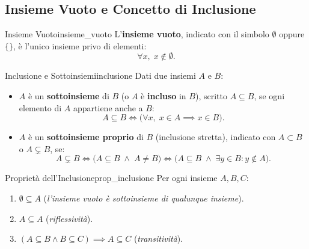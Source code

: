 \subsection{Insieme Vuoto e Concetto di Inclusione}

\begin{definizione}{Insieme Vuoto}{insieme_vuoto}
L'\textbf{insieme vuoto}, indicato con il simbolo $\emptyset$ oppure $\{\}$, è l'unico insieme privo di elementi:
\begin{equation}
    \forall x, \; x \notin \emptyset.
\end{equation}
\end{definizione}

\begin{definizione}{Inclusione e Sottoinsiemi}{inclusione}
Dati due insiemi $A$ e $B$:
\begin{itemize}
    \item $A$ è un \textbf{sottoinsieme} di $B$ (o $A$ è \textbf{incluso} in $B$), scritto $A \subseteq B$, se ogni elemento di $A$ appartiene anche a $B$:
    \begin{equation}
        A \subseteq B \iff \big(\forall x, \; x \in A \implies x \in B\big).
    \end{equation}
    \item $A$ è un \textbf{sottoinsieme proprio} di $B$ (inclusione stretta), indicato con $A \subset B$ o $A \subsetneq B$, se:
    \begin{equation}
        A \subsetneq B \iff \big(A \subseteq B \;\land\; A \neq B\big) \iff \big(A \subseteq B \;\land\; \exists y \in B : y \notin A\big).
    \end{equation}
\end{itemize}
\end{definizione}

\begin{proposizione}{Proprietà dell'Inclusione}{prop_inclusione}
Per ogni insieme $A, B, C$:
\begin{enumerate}
    \item $\emptyset \subseteq A$ (\emph{l'insieme vuoto è sottoinsieme di qualunque insieme}).
    \item $A \subseteq A$ (\emph{riflessività}).
    \item $(A \subseteq B \land B \subseteq C) \implies A \subseteq C$ (\emph{transitività}).
\end{enumerate}
\end{proposizione}

